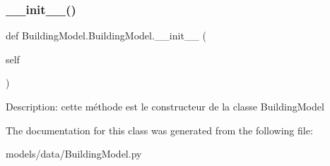 \subsubsection{\texorpdfstring{\+\_\+\+\_\+init\+\_\+\+\_\+()}{\_\_init\_\_()}}
{\footnotesize\ttfamily def Building\+Model.\+Building\+Model.\+\_\+\+\_\+init\+\_\+\+\_\+ (\begin{DoxyParamCaption}\item[{}]{self }\end{DoxyParamCaption})}

\begin{DoxyVerb}Description: cette méthode est le constructeur de la classe BuildingModel
\end{DoxyVerb}
 

The documentation for this class was generated from the following file\+:\begin{DoxyCompactItemize}
\item 
models/data/Building\+Model.\+py\end{DoxyCompactItemize}
